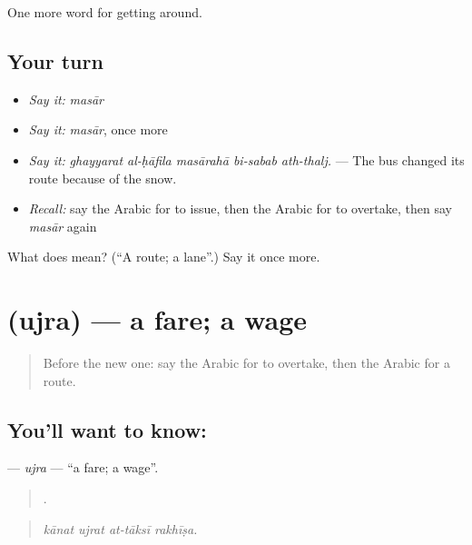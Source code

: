 \begin{grammarlens}[title={What you've built}]
One more word for getting around.
\end{grammarlens}

\subsection*{Your turn}
\begin{itemize}
\raggedright
  \item \emph{Say it:} \emph{masār}
  \item \emph{Say it:} \emph{masār}, once more
  \item \emph{Say it:} \emph{ghayyarat al-ḥāfila masārahā bi-sabab ath-thalj.} — The bus changed its route because of the snow.
  \item \emph{Recall:} say the Arabic for to issue, then the Arabic for to overtake, then say \emph{masār} again
\end{itemize}

\begin{tcolorbox}[breakable,colback=teal!4,colframe=teal!35!black,title={Before you move on}]
What does  mean? (\textquotedblleft{}A route; a lane\textquotedblright{}.) Say it once more.
\end{tcolorbox}
\section[\texorpdfstring{\ar{أجرة} (ujra)}{أجرة (ujra)}]{ (ujra) — a fare; a wage}

\label{lesson:AR-C435-ujra}



\begin{quote}
Before the new one: say the Arabic for to overtake, then the Arabic for a route.
\end{quote}

\subsection*{You'll want to know: }
\textbf{} — \emph{ujra} — \textquotedblleft{}a fare; a wage\textquotedblright{}.

\begin{quote}
   .
\end{quote}

\begin{quote}
\emph{kānat ujrat at-tāksī rakhīṣa.}
\end{quote}

